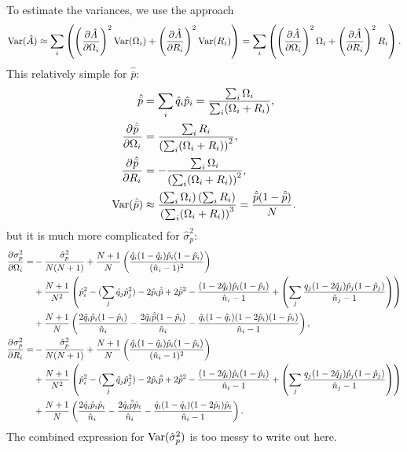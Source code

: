 \documentclass[12pt]{article}
\begin{document}
To estimate the variances, we use the approach
%
\begin{equation}\label{eq:estvarest}
  \var(\hat{A}) \approx \sum_i\prn{ \pdiffc{\hat{A}}{\Omega_i}^2 \var(\Omega_i) + \pdiffc{\hat{A}}{R_i}^2 \var(R_i) } = \sum_i\prn{ \pdiffc{\hat{A}}{\Omega_i}^2 \Omega_i + \pdiffc{\hat{A}}{R_i}^2 R_i }.
\end{equation}
%
This relatively simple for $\hat{\bar{p}}$:
%
\begin{equation}\label{eq:varpbar}
  \begin{aligned}
    \hat{\bar{p}} &= \sum_i \hat{q}_i \hat{p}_i =  \frac{\sum_i\Omega_i}{\sum_i(\Omega_i+R_i)}, \\
    \pdiff{\hat{\bar{p}}}{\Omega_i}  &= \frac{\sum_iR_i}{\prn{\sum_i(\Omega_i+R_i)}^2},\\
    \pdiff{\hat{\bar{p}}}{R_i}  &= -\frac{\sum_i\Omega_i}{\prn{\sum_i(\Omega_i+R_i)}^2},\\
    \var(\hat{\bar{p}}) &\approx \frac{\prn{\sum_i\Omega_i}\prn{\sum_iR_i}}{\prn{\sum_i(\Omega_i+R_i)}^3} = \frac{\hat{\bar{p}}(1-\hat{\bar{p}})}{N}.
  \end{aligned}
\end{equation}
%
but it is much more complicated for $\hat{\sigma}_p^2$:
%
\begin{equation}\label{eq:varsigmap}
  \begin{aligned}
    \pdiff{\sigma_p^2}{\Omega_i} =& -\frac{\hat{\sigma}_p^2}{N(N+1)} + \frac{N+1}{N} \prn{\frac{\hat{q}_i (1-\hat{q}_i) \hat{p}_i (1-\hat{p}_i)} {(\hat{n}_i-1)^2}}
    \\ &+
    \frac{N+1}{N^2} \prn{ \hat{p}_i^2 - (\sum_j \hat{q}_j\hat{p}_j^2) - 2 \hat{p}_i\hat{\bar{p}} + 2 \hat{\bar{p}}^2 - \frac{(1-2\hat{q}_i) \hat{p}_i (1-\hat{p}_i)} {\hat{n}_i-1} + \prn{\sum_j \frac{q_j(1-2\hat{q}_j) \hat{p}_j (1-\hat{p}_j)} {\hat{n}_j-1} }
    }\\&+
    \frac{N+1}{N} \prn{  \frac{2\hat{q}_i \hat{p}_i (1-\hat{p}_i)} {\hat{n}_i} - \frac{2\hat{q}_i \hat{\bar{p}} (1-\hat{p}_i)} {\hat{n}_i} -  \frac{\hat{q}_i(1-\hat{q}_i) (1-2\hat{p}_i) (1-\hat{p}_i)} {\hat{n}_i-1}
    },\\
    \pdiff{\sigma_p^2}{R_i} =&
    -\frac{\hat{\sigma}_p^2}{N(N+1)} + \frac{N+1}{N} \prn{\frac{\hat{q}_i (1-\hat{q}_i) \hat{p}_i (1-\hat{p}_i)} {(\hat{n}_i-1)^2}}
    \\ &+
    \frac{N+1}{N^2} \prn{ \hat{p}_i^2 - (\sum_j \hat{q}_j\hat{p}_j^2) - 2 \hat{p}_i\hat{\bar{p}} + 2 \hat{\bar{p}}^2 - \frac{(1-2\hat{q}_i) \hat{p}_i (1-\hat{p}_i)} {\hat{n}_i-1} + \prn{\sum_j \frac{q_j(1-2\hat{q}_j) \hat{p}_j (1-\hat{p}_j)} {\hat{n}_j-1} }
    }\\&+
    \frac{N+1}{N} \prn{  \frac{2\hat{q}_i \hat{p}_i \hat{p}_i} {\hat{n}_i} - \frac{2\hat{q}_i \hat{\bar{p}} \hat{p}_i} {\hat{n}_i} -  \frac{\hat{q}_i(1-\hat{q}_i) (1-2\hat{p}_i) \hat{p}_i} {\hat{n}_i-1}
    }.
  \end{aligned}
\end{equation}
%
The combined expression for $\operatorname{Var}(\hat{\sigma}_p^2)$ is too messy to write out here.
\end{document}
